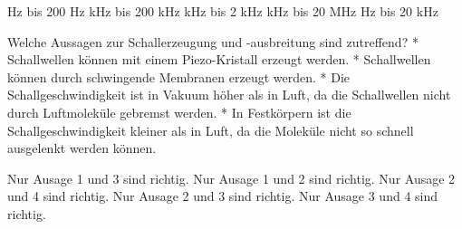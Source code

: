 \documentclass[11pt]{exam}
\begin{document}
\begin{questions}
\begin{choices}
	 Hz bis 200 Hz
	 kHz bis 200 kHz
	 kHz bis 2 kHz
	 kHz bis 20 MHz
	 Hz bis 20 kHz
\end{choices}

\vspace{3mm}\question Welche Aussagen zur Schallerzeugung und -ausbreitung sind zutreffend?	* Schallwellen können mit einem Piezo-Kristall erzeugt werden.	* Schallwellen können durch schwingende Membranen erzeugt werden.	* Die Schallgeschwindigkeit ist in Vakuum höher als in Luft, da die Schallwellen nicht durch Luftmoleküle gebremst werden.	* In Festkörpern ist die Schallgeschwindigkeit kleiner als in Luft, da die Moleküle nicht so schnell ausgelenkt werden können. 

\begin{choices}
	\choice Nur Ausage 1 und 3 sind richtig.
	\choice Nur Ausage 1 und 2 sind richtig.
	\choice Nur Ausage 2 und 4 sind richtig.
	\choice Nur Ausage 2 und 3 sind richtig.
	\choice Nur Ausage 3 und 4 sind richtig.
\end{choices}

\vspace{3mm}\end{questions}
\end{document}
